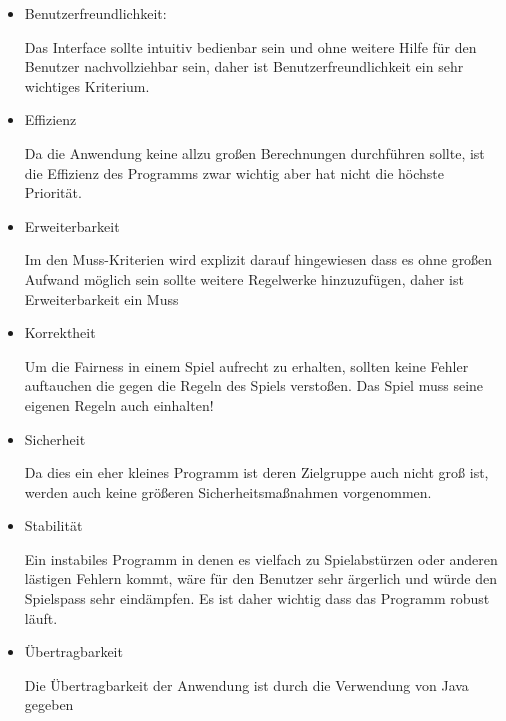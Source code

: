\documentclass{article}
\begin{document}
\begin{itemize}
\item Benutzerfreundlichkeit:

Das Interface sollte intuitiv bedienbar sein und ohne weitere Hilfe für den Benutzer nachvollziehbar sein, daher ist Benutzerfreundlichkeit ein sehr wichtiges Kriterium. 

\item Effizienz

Da die Anwendung keine allzu großen Berechnungen durchführen sollte, ist die Effizienz des Programms zwar wichtig aber hat nicht die höchste Priorität.

\item Erweiterbarkeit

Im den Muss-Kriterien wird explizit darauf hingewiesen dass es ohne großen Aufwand möglich sein sollte weitere Regelwerke hinzuzufügen, daher ist Erweiterbarkeit ein Muss

\item Korrektheit

Um die Fairness in einem Spiel aufrecht zu erhalten, sollten keine Fehler auftauchen die gegen die Regeln des Spiels verstoßen. Das Spiel muss seine eigenen Regeln auch einhalten!

\item Sicherheit

Da dies ein eher kleines Programm ist deren Zielgruppe auch nicht groß ist, werden auch keine größeren Sicherheitsmaßnahmen vorgenommen.

\item Stabilität

Ein instabiles Programm in denen es vielfach zu Spielabstürzen oder anderen lästigen Fehlern kommt, wäre für den Benutzer sehr ärgerlich und würde den Spielspass sehr eindämpfen. Es ist daher wichtig dass das Programm robust läuft.

\item Übertragbarkeit

Die Übertragbarkeit der Anwendung ist durch die Verwendung von Java gegeben
\end{itemize}
\newpage
\printglossaries
\end{document}
